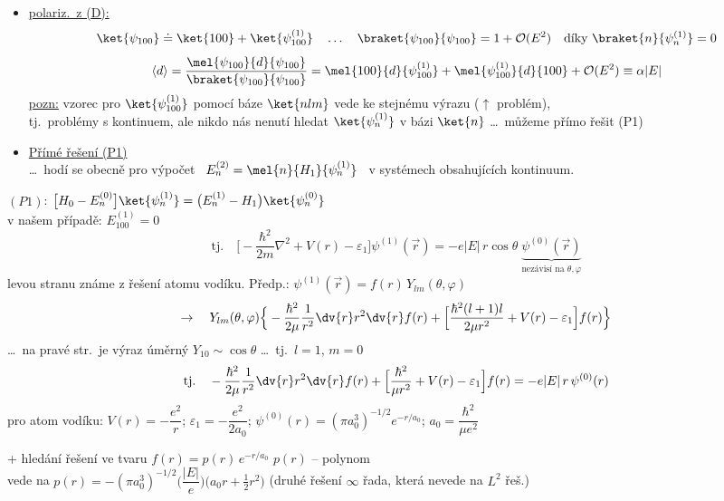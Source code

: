 \begin{priklad}
\begin{itemize}
  \item \underline{polariz.\ z (D):}
  \[
    \ket{\psi_{100}} \doteq \ket{100} + \ket{\psi_{100}^{(1)}} \quad\dots\quad \braket{\psi_{100}}{\psi_{100}} = 1 + \mathcal{O}(E^2) \quad\text{díky } \braket{n}{\psi_n^{(1)}} = 0
  \]
  \[
    \langle d\rangle = \frac{\mel{\psi_{100}}{d}{\psi_{100}}}{\braket{\psi_{100}}{\psi_{100}}}
    = \mel{100}{d}{\psi_{100}^{(1)}} + \mel{\psi_{100}^{(1)}}{d}{100} + \mathcal{O}(E^2) \equiv \alpha|E|
  \]
  \underline{pozn:} vzorec pro $\ket{\psi_{100}^{(1)}}$ pomocí báze $\ket{nlm}$ vede ke stejnému výrazu ($\uparrow$ problém), \\
  tj.\ problémy s kontinuem, ale nikdo nás nenutí hledat $\ket{\psi_n^{(1)}}$ v bázi $\ket{n}$ \dots\ můžeme přímo řešit (P1)

  \item \underline{Přímé řešení (P1)} \\
  \dots\ hodí se obecně pro výpočet \ $E_n^{(2)} = \mel{n}{H_1}{\psi_n^{(1)}}$ \ v systémech obsahujících kontinuum.
\end{itemize}
\end{priklad}

$(P1)$: \quad $\big[H_0 - E_n^{(0)}\big]\ket{\psi_n^{(1)}} = \big(E_n^{(1)} - H_1\big)\ket{\psi_n^{(0)}}$ \\
v našem případě: \quad $E_{100}^{(1)} = 0$
\[
  \text{tj.}\quad \Big[-\frac{\hbar^2}{2m}\nabla^2 + V(r) - \varepsilon_1\Big]\psi^{(1)}(\vec r) = -e|E|\,r\cos\theta\;\underbrace{\psi^{(0)}(\vec r)}_{\text{nezávisí na } \theta,\varphi}
\]
levou stranu známe z řešení atomu vodíku. \quad Předp.: \quad $\psi^{(1)}(\vec r) = f(r)\,Y_{lm}(\theta,\varphi)$
\[
  \to\quad Y_{lm}(\theta,\varphi)\Big\{-\frac{\hbar^2}{2\mu}\frac{1}{r^2}\dv{r}r^2\dv{r}f(r) + \Big[\frac{\hbar^2(l+1)l}{2\mu r^2} + V(r) - \varepsilon_1\Big]f(r)\Big\}
\]
\dots\ na pravé str.\ je výraz úměrný $Y_{10}\sim\cos\theta$ \dots\ tj.\ $l = 1$, $m = 0$
\[
  \text{tj.}\quad -\frac{\hbar^2}{2\mu}\frac{1}{r^2}\dv{r}r^2\dv{r}f(r) + \Big[\frac{\hbar^2}{\mu r^2} + V(r) - \varepsilon_1\Big]f(r) = -e|E|\,r\,\psi^{(0)}(r)
\]
pro atom vodíku: \quad $V(r) = -\dfrac{e^2}{r}$; \quad $\varepsilon_1 = -\dfrac{e^2}{2a_0}$; \quad
$\psi^{(0)}(r) = (\pi a_0^3)^{-1/2}e^{-r/a_0}$; \quad $a_0 = \dfrac{\hbar^2}{\mu e^2}$

+ hledání řešení ve tvaru \quad $f(r) = p(r)\,e^{-r/a_0}$ \qquad $p(r)$ -- polynom \\
vede na \quad $p(r) = -(\pi a_0^3)^{-1/2}\Big(\dfrac{|E|}{e}\Big)\big(a_0r + \tfrac12 r^2\big)$
\quad (druhé řešení $\infty$ řada, která nevede na $L^2$ řeš.)

